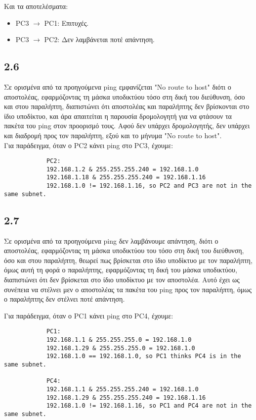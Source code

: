 \documentclass[a4paper, 12pt]{article}
\begin{document}
		Και τα αποτελέσματα:

		\begin{itemize}
			\item PC3 $\rightarrow$ PC1: Επιτυχές.
			\item PC3 $\rightarrow$ PC2: Δεν λαμβάνεται ποτέ απάντηση.		
		\end{itemize}

	\subsection*{2.6}
		Σε ορισμένα από τα προηγούμενα ping εμφανίζεται "No route to host" διότι ο αποστολέας, εφαρμόζοντας τη μάσκα υποδικτύου τόσο στη δική του διεύθυνση, όσο και στου παραλήπτη, διαπιστώνει ότι αποστολέας και παραλήπτης δεν βρίσκονται στο ίδιο υποδίκτυο, και άρα απαιτείται η παρουσία δρομολογητή για να φτάσουν τα πακέτα του ping στον προορισμό τους. Αφού δεν υπάρχει δρομολογητής, δεν υπάρχει και διαδρομή προς τον παραλήπτη, εξού και το μήνυμα "No route to host". \\
		
		Για παράδειγμα, όταν ο PC2 κάνει ping στο PC3, έχουμε:
		
		\begin{verbatim}
			PC2:
			192.168.1.2 & 255.255.255.240 = 192.168.1.0
			192.168.1.18 & 255.255.255.240 = 192.168.1.16
			192.168.1.0 != 192.168.1.16, so PC2 and PC3 are not in the same subnet.
		\end{verbatim}

	\subsection*{2.7}
		Σε ορισμένα από τα προηγούμενα ping δεν λαμβάνουμε απάντηση, διότι ο αποστολέας, εφαρμόζοντας τη μάσκα υποδικτύου του τόσο στη δική του διεύθυνση, όσο και στου παραλήπτη, θεωρεί πως βρίσκεται στο ίδιο υποδίκτυο με τον παραλήπτη, όμως αυτή τη φορά ο παραλήπτης, εφαρμόζοντας τη δική του μάσκα υποδικτύου, διαπιστώνει ότι δεν βρίσκεται στο ίδιο υποδίκτυο με τον αποστολέα. Αυτό έχει ως συνέπεια να στέλνει μεν ο αποστολέας τα πακέτα του ping προς τον παραλήπτη, όμως ο παραλήπτης δεν στέλνει ποτέ απάντηση.
		
		Για παράδειγμα, όταν ο PC1 κάνει ping στο PC4, έχουμε:
		
		\begin{verbatim}
			PC1:
			192.168.1.1 & 255.255.255.0 = 192.168.1.0
			192.168.1.29 & 255.255.255.0 = 192.168.1.0
			192.168.1.0 == 192.168.1.0, so PC1 thinks PC4 is in the same subnet.
			
			PC4:
			192.168.1.1 & 255.255.255.240 = 192.168.1.0
			192.168.1.29 & 255.255.255.240 = 192.168.1.16
			192.168.1.0 != 192.168.1.16, so PC1 and PC4 are not in the same subnet.
		\end{verbatim} 
\end{document}
